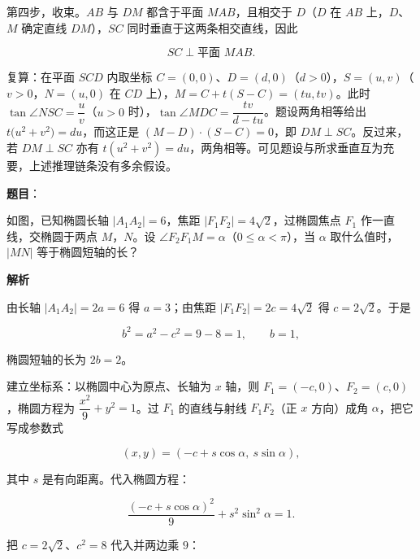 \begin{answer}
第四步，收束。$AB$ 与 $DM$ 都含于平面 $MAB$，且相交于 $D$（$D$ 在 $AB$ 上，$D$、$M$ 确定直线 $DM$），$SC$ 同时垂直于这两条相交直线，因此

\nopagebreak[4]
\[
SC\perp\text{平面 }MAB.
\]

复算：在平面 $SCD$ 内取坐标 $C=(0,0)$、$D=(d,0)$（$d>0$），$S=(u,v)$（$v>0$，$N=(u,0)$ 在 $CD$ 上），$M=C+t(S-C)=(tu,tv)$。此时 $\tan\angle NSC=\dfrac{u}{v}$（$u>0$ 时），$\tan\angle MDC=\dfrac{tv}{d-tu}$。题设两角相等给出 $t\bigl(u^2+v^2\bigr)=du$，而这正是 $(M-D)\cdot(S-C)=0$，即 $DM\perp SC$。反过来，若 $DM\perp SC$ 亦有 $t(u^2+v^2)=du$，两角相等。可见题设与所求垂直互为充要，上述推理链条没有多余假设。


\end{answer}
\begin{answer}

\textbf{题目}：

如图，已知椭圆长轴 $\lvert A_1A_2\rvert=6$，焦距 $\lvert F_1F_2\rvert=4\sqrt2$，过椭圆焦点 $F_1$ 作一直线，交椭圆于两点 $M$，$N$。设 $\angle F_2F_1M=\alpha$（$0\leqslant\alpha<\pi$），当 $\alpha$ 取什么值时，$\lvert MN\rvert$ 等于椭圆短轴的长？
\nopagebreak[4]
\begin{center}\end{center}
\nopagebreak[4]
\textbf{解析}
\nopagebreak[4]
\begin{center}\end{center}
\nopagebreak[4]
由长轴 $\lvert A_1A_2\rvert=2a=6$ 得 $a=3$；由焦距 $\lvert F_1F_2\rvert=2c=4\sqrt2$ 得 $c=2\sqrt2$。于是

\nopagebreak[4]
\[
b^2=a^2-c^2=9-8=1,\qquad b=1,
\]

椭圆短轴的长为 $2b=2$。

建立坐标系：以椭圆中心为原点、长轴为 $x$ 轴，则 $F_1=(-c,0)$、$F_2=(c,0)$，椭圆方程为 $\dfrac{x^2}{9}+y^2=1$。过 $F_1$ 的直线与射线 $F_1F_2$（正 $x$ 方向）成角 $\alpha$，把它写成参数式

\nopagebreak[4]
\[
(x,y)=(-c+s\cos\alpha,\ s\sin\alpha),
\]

其中 $s$ 是有向距离。代入椭圆方程：

\nopagebreak[4]
\[
\frac{(-c+s\cos\alpha)^2}{9}+s^2\sin^2\alpha=1.
\]

把 $c=2\sqrt2$、$c^2=8$ 代入并两边乘 $9$：


\end{answer}
